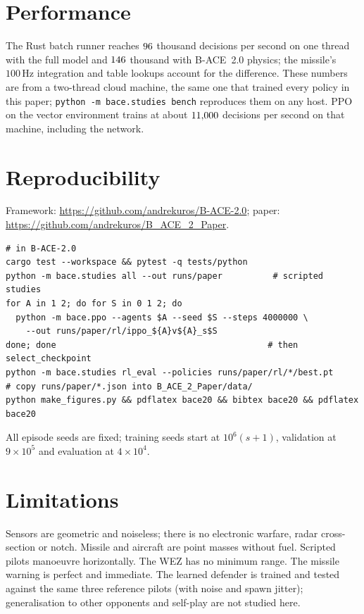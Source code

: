 \documentclass[11pt,a4paper]{article}
\begin{document}
\section{Performance}

The Rust batch runner reaches $96$ thousand decisions per second on one thread with the full model and $146$ thousand with B-ACE~2.0 physics; the missile's $100\,\mathrm{Hz}$ integration and table lookups account for the difference.
These numbers are from a two-thread cloud machine, the same one that trained every policy in this paper; \texttt{python -m bace.studies bench} reproduces them on any host.
PPO on the vector environment trains at about $11{,}000$ decisions per second on that machine, including the network.

\section{Reproducibility}

Framework: \url{https://github.com/andrekuros/B-ACE-2.0}; paper: \url{https://github.com/andrekuros/B_ACE_2_Paper}.
\begin{verbatim}
# in B-ACE-2.0
cargo test --workspace && pytest -q tests/python
python -m bace.studies all --out runs/paper          # scripted studies
for A in 1 2; do for S in 0 1 2; do
  python -m bace.ppo --agents $A --seed $S --steps 4000000 \
    --out runs/paper/rl/ippo_${A}v${A}_s$S
done; done                                          # then select_checkpoint
python -m bace.studies rl_eval --policies runs/paper/rl/*/best.pt
# copy runs/paper/*.json into B_ACE_2_Paper/data/
python make_figures.py && pdflatex bace20 && bibtex bace20 && pdflatex bace20
\end{verbatim}
All episode seeds are fixed; training seeds start at $10^6(s+1)$, validation at $9\times10^5$ and evaluation at $4\times10^4$.

\section{Limitations}

Sensors are geometric and noiseless; there is no electronic warfare, radar cross-section or notch.
Missile and aircraft are point masses without fuel.
Scripted pilots manoeuvre horizontally.
The WEZ has no minimum range.
The missile warning is perfect and immediate.
The learned defender is trained and tested against the same three reference pilots (with noise and spawn jitter); generalisation to other opponents and self-play are not studied here.
\end{document}
